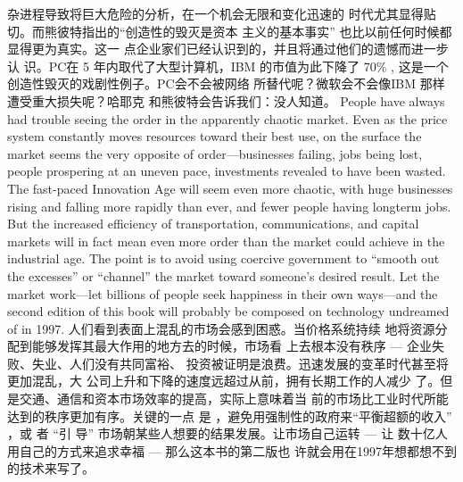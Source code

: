 \begin{paracol}{2}
杂进程导致将巨大危险的分析，在一个机会无限和变化迅速的
时代尤其显得贴切。而熊彼特指出的“创造性的毁灭是资本
主义的基本事实” 也比以前任何时候都显得更为真实。这一
点企业家们已经认识到的，并且将通过他们的遗憾而进一步认
识。PC在 5 年内取代了大型计算机，IBM 的市值为此下降了
70\% , 这是一个创造性毁灭的戏剧性例子。PC会不会被网络
所替代呢？微软会不会像IBM 那样遭受重大损失呢？哈耶克
和熊彼特会告诉我们：没人知道。
\switchcolumn*
People have always had trouble seeing the order in the apparently chaotic market. Even as the price system constantly
moves resources toward their best use, on the surface the market seems the very opposite of order---businesses failing, jobs
being lost, people prospering at an uneven pace, investments
revealed to have been wasted. The fast-paced Innovation Age
will seem even more chaotic, with huge businesses rising and
falling more rapidly than ever, and fewer people having longterm jobs. But the increased efficiency of transportation, communications, and capital markets will in fact mean even more
order than the market could achieve in the industrial age. The
point is to avoid using coercive government to ``smooth out the
excesses'' or ``channel'' the market toward someone's desired result. Let the market work---let billions of people seek happiness
in their own ways---and the second edition of this book will
probably be composed on technology undreamed of in 1997.
\switchcolumn
人们看到表面上混乱的市场会感到困惑。当价格系统持续
地将资源分配到能够发挥其最大作用的地方去的时候，市场看
上去根本没有秩序 --- 企业失败、失业、人们没有共同富裕、
投资被证明是浪费。迅速发展的变革时代甚至将更加混乱，大
公司上升和下降的速度远超过从前，拥有长期工作的人减少
了。但是交通、通信和资本市场效率的提高，实际上意味着当
前的市场比工业时代所能达到的秩序更加有序。关键的一点
是 ，避免用强制性的政府来“平衡超额的收入” ，或 者 “引
导” 市场朝某些人想要的结果发展。让市场自己运转 --- 让
数十亿人用自己的方式来追求幸福 --- 那么这本书的第二版也
许就会用在1997年想都想不到的技术来写了。


\end{paracol}
